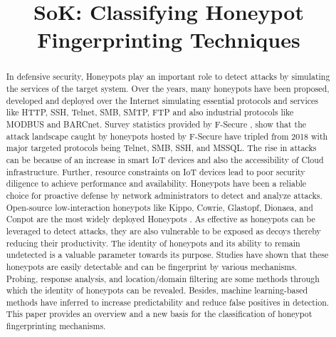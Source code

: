\documentclass[letterpaper, 10 pt, conference]{ieeeconf}  %
\title{\LARGE \bf
SoK: Classifying Honeypot Fingerprinting Techniques
}
\begin{document}
\maketitle
\thispagestyle{empty}
\pagestyle{empty}



\begin{abstract}
In defensive security, Honeypots play an important role to detect attacks by simulating the services of the target system. Over the years, many honeypots have been proposed, developed and deployed over the Internet simulating essential protocols and services like HTTP, SSH, Telnet, SMB, SMTP, FTP and also industrial protocols like MODBUS and BARCnet. Survey statistics provided by F-Secure \cite{F-Secure}, show that the attack landscape caught by honeypots hosted by F-Secure have tripled from 2018 with major targeted protocols being Telnet, SMB, SSH, and  MSSQL. The rise in attacks can be because of an increase in smart IoT devices and also the accessibility of Cloud infrastructure. Further, resource constraints on IoT devices lead to poor security diligence to achieve performance and availability. Honeypots have been a reliable choice for proactive defense by network administrators to detect and analyze attacks. Open-source low-interaction honeypots like Kippo, Cowrie, Glastopf, Dionaea, and Conpot are the most widely deployed Honeypots \cite{Vetterl2018}. As effective as honeypots can be leveraged to detect attacks, they are also vulnerable to be exposed as decoys thereby reducing their productivity. The identity of honeypots and its ability to remain undetected is a valuable parameter towards its purpose. Studies have shown that these honeypots are easily detectable and can be fingerprint by various mechanisms. Probing, response analysis, and location/domain filtering are some methods through which the identity of honeypots can be revealed. Besides, machine learning-based methods have inferred to increase predictability and reduce false positives in detection. This paper provides an overview and a new basis for the classification of honeypot fingerprinting mechanisms. 
\end{abstract}




\end{document}
